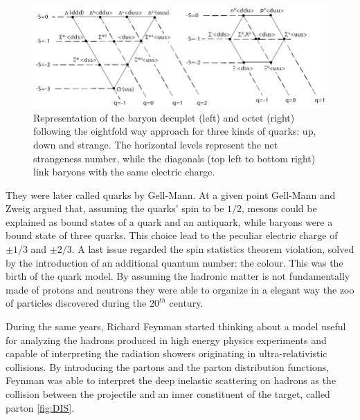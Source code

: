 \begin{figure}[!ht]
\begin{center}
\includegraphics[width=0.8\linewidth]{Chapters/Introduction/Figs/eightfold_way.png}
\caption{Representation of the baryon decuplet (left) and octet (right) following the eightfold way approach for three kinds of quarks: up, down and strange. The horizontal levels represent the net strangeness number, while the diagonals (top left to bottom right) link baryons with the same electric charge.}
\label{fig:gelmann}
\end{center}
\end{figure}

They were later called quarks by Gell-Mann.
At a given point Gell-Mann and Zweig argued that, assuming the quarks' spin to be $1/2$, mesons could be explained as bound states of a quark and an antiquark, while baryons were a bound state of three quarks.
This choice lead to the peculiar electric charge of $\pm1/3$ and $\pm2/3$.
A last issue regarded the spin statistics theorem violation, solved by the introduction of an additional quantum number: the colour.
This was the birth of the quark model.
By assuming the hadronic matter is not fundamentally made of protons and neutrons they were able to organize in a elegant way the zoo of particles discovered during the $20^{th}$ century.

During the same years, Richard Feynman started thinking about a model useful for analyzing the hadrons produced in high energy physics experiments and capable of interpreting the radiation showers originating in ultra-relativistic collisions.
By introducing the partons and the parton distribution functions, Feynman was able to interpret the deep inelastic scattering on hadrons as the collision between the projectile and an inner constituent of the target, called parton \ref{fig:DIS}.

